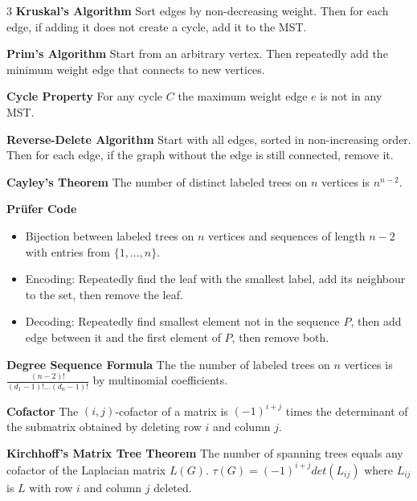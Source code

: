 \documentclass[10pt, landscape]{article}
\begin{document}
\begin{multicols*}{3}
\textbf{Kruskal's Algorithm} Sort edges by non-decreasing weight. Then for each edge, if adding it does not create a cycle, add it to the MST.

\textbf{Prim's Algorithm} Start from an arbitrary vertex. Then repeatedly add the minimum weight edge that connects to new vertices.

\textbf{Cycle Property} For any cycle $C$ the maximum weight edge $e$ is not in any MST.

\textbf{Reverse-Delete Algorithm} Start with all edges, sorted in non-increasing order. Then for each edge, if the graph without the edge is still connected, remove it.

\textbf{Cayley's Theorem} The number of distinct labeled trees on $n$ vertices is $n^{n-2}$.

\textbf{Prüfer Code}
\begin{itemize}
    \item Bijection between labeled trees on $n$ vertices and sequences of length $n-2$ with entries from $\{1,...,n\}$.
    \item Encoding: Repeatedly find the leaf with the smallest label, add its neighbour to the set, then remove the leaf.
    \item Decoding: Repeatedly find smallest element not in the sequence $P$, then add edge between it and the first element of $P$, then remove both.
\end{itemize}

\textbf{Degree Sequence Formula} The the number of labeled trees on $n$ vertices is $\frac{(n-2)!}{(d_1-1)!...(d_n-1)!}$ by multinomial coefficients.


\textbf{Cofactor} The $(i,j)$-cofactor of a matrix is $(-1)^{i+j}$ times the determinant of the submatrix obtained by deleting row $i$ and column $j$.

\textbf{Kirchhoff's Matrix Tree Theorem} The number of spanning trees equals any cofactor of the Laplacian matrix $L(G)$. $\tau(G)=(-1)^{i+j}det(L_{ij})$ where $L_{ij}$ is $L$ with row $i$ and column $j$ deleted.


\end{multicols*}
\end{document}
